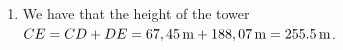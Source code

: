 {\begin{mdframed}[linewidth=4, leftmargin=40, rightmargin=40]
\begin{exercise}
\begin{enumerate}[noitemsep, label=\textbf{Step} \textbf{\arabic*}. ]
    \begin{equation}
    \begin{array}{ccc}\hfill tan\left(D\hat{B}E\right)& =& \frac{DE}{BD}\hfill \\ \hfill \ensuremath{\Rightarrow}\phantom{\rule{4pt}{0ex}}\phantom{\rule{4pt}{0ex}}\phantom{\rule{4pt}{0ex}}\phantom{\rule{4pt}{0ex}}DE& =& BD\ensuremath{\times}tan\left(D\hat{B}E\right)\hfill \\ & =& 100\ensuremath{\times}tan{62}^{\circ }\hfill \\ & =& 188,07\phantom{\rule{0.166667em}{0ex}}\mathrm{m}\hfill \end{array}\tag{14.27}
      \end{equation}
        \item  
        \label{m39411*id82527}We have that the height of the tower
$CE=CD+DE=67,45\phantom{\rule{0.166667em}{0ex}}\mathrm{m}+188,07\phantom{\rule{0.166667em}{0ex}}\mathrm{m}=255.5\phantom{\rule{0.166667em}{0ex}}\mathrm{m}$.
 \par 
        \end{enumerate}
    \end{exercise}
    \end{mdframed}
    }
    \noindent
      \label{m39411*uid27}
